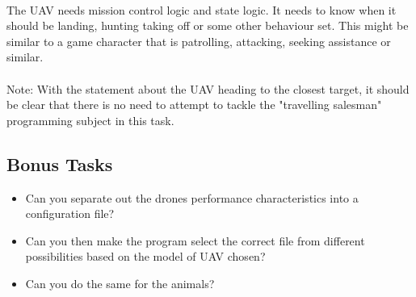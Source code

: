 \documentclass[11pt]{book}
\begin{document}
\paragraph{} The UAV needs mission control logic and state logic. It needs to
know when it should be landing, hunting taking off or some other behaviour
set. This might be similar to a game character that is patrolling, attacking,
seeking assistance or similar.

\paragraph{} Note: With the statement about the UAV heading to the closest
target, it should be clear that there is no need to attempt to tackle the
"travelling salesman" programming subject in this task.

\subsection{Bonus Tasks}

\begin{itemize}
\item Can you separate out the drones performance characteristics into a configuration file?
\item Can you then make the program select the correct file from different possibilities based on the model of UAV chosen? 
\item Can you do the same for the animals?
\end{itemize}

\clearpage
\end{document}
